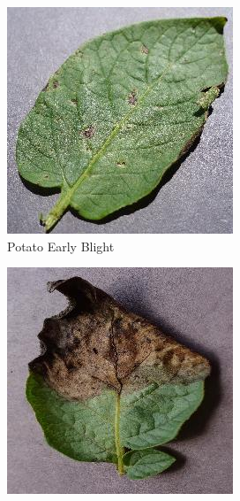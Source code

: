 \documentclass{article}
\begin{document}
\begin{figure}[h]
    \centering
    \begin{subfigure}[b]{0.32\textwidth}
        \centering
        \includegraphics[width=\textwidth]{early_blight_sample.png}
        \caption{Potato Early Blight}
        \label{fig:early_blight}
    \end{subfigure}
    \hfill
    \begin{subfigure}[b]{0.32\textwidth}
        \centering
        \includegraphics[width=\textwidth]{late_blight_sample.png}

\end{subfigure}
\end{figure}
\end{document}
